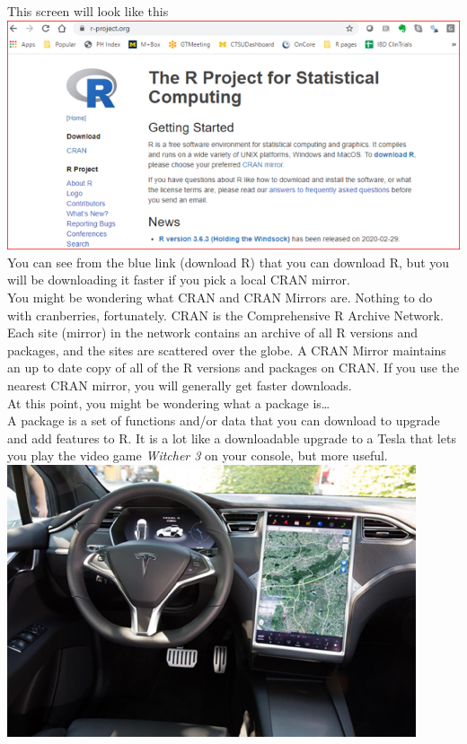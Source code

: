 \documentclass[
]{book}
\begin{document}
This screen will look like this
\includegraphics{images/r-project.png}\\
You can see from the blue link (download R) that you can download R, but you will be downloading it faster if you pick a local CRAN mirror.\\
You might be wondering what CRAN and CRAN Mirrors are. Nothing to do with cranberries, fortunately. CRAN is the Comprehensive R Archive Network. Each site (mirror) in the network contains an archive of all R versions and packages, and the sites are scattered over the globe. A CRAN Mirror maintains an up to date copy of all of the R versions and packages on CRAN. If you use the nearest CRAN mirror, you will generally get faster downloads.\\
At this point, you might be wondering what a package is\ldots{}\\
A package is a set of functions and/or data that you can download to upgrade and add features to R. It is a lot like a downloadable upgrade to a Tesla that lets you play the video game \emph{Witcher 3} on your console, but more useful.
\includegraphics{images/dash-tesla.png}
\end{document}
